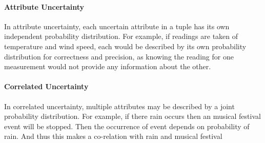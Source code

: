 \paragraph{Attribute Uncertainty}
In attribute uncertainty, each uncertain attribute in a tuple has its own independent probability distribution. For example, if readings are taken of temperature and wind speed, each would be described by its own probability distribution for correctness and precision, as knowing the reading for one measurement would not provide any information about the other.
\paragraph{Correlated Uncertainty}
In correlated uncertainty, multiple attributes may be described by a joint probability distribution. For example, if there rain occurs then an musical festival event will be stopped. Then the occurrence of event depends on probability of rain. And thus this makes a co-relation with rain and musical festival
